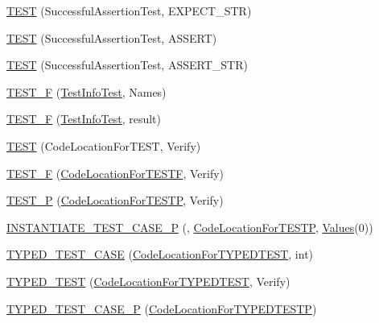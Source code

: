 \begin{DoxyCompactItemize}
\item 
\mbox{\hyperlink{namespacetesting_a9b1e4b53f277d25e6d6413a0004481bb}{T\+E\+ST}} (Successful\+Assertion\+Test, E\+X\+P\+E\+C\+T\+\_\+\+S\+TR)
\item 
\mbox{\hyperlink{namespacetesting_afbe4c8233faff6eba04902b3cb041632}{T\+E\+ST}} (Successful\+Assertion\+Test, A\+S\+S\+E\+RT)
\item 
\mbox{\hyperlink{namespacetesting_a83dfac108c207258287b9f7aa9171e8a}{T\+E\+ST}} (Successful\+Assertion\+Test, A\+S\+S\+E\+R\+T\+\_\+\+S\+TR)
\item 
\mbox{\hyperlink{namespacetesting_acd53db89097aba1468724d6446069b1e}{T\+E\+S\+T\+\_\+F}} (\mbox{\hyperlink{classtesting_1_1TestInfoTest}{Test\+Info\+Test}}, Names)
\item 
\mbox{\hyperlink{namespacetesting_ab00e29c00b3e29cdfa21d23b79dd3776}{T\+E\+S\+T\+\_\+F}} (\mbox{\hyperlink{classtesting_1_1TestInfoTest}{Test\+Info\+Test}}, result)
\item 
\mbox{\hyperlink{namespacetesting_af597d0ad4de0197141b78e9c1035e491}{T\+E\+ST}} (Code\+Location\+For\+T\+E\+ST, Verify)
\item 
\mbox{\hyperlink{namespacetesting_a782ec43081903a0aaa6d009218eba2a8}{T\+E\+S\+T\+\_\+F}} (\mbox{\hyperlink{classtesting_1_1CodeLocationForTESTF}{Code\+Location\+For\+T\+E\+S\+TF}}, Verify)
\item 
\mbox{\hyperlink{namespacetesting_af05768b7e2f14652d2c4f274ba1a5544}{T\+E\+S\+T\+\_\+P}} (\mbox{\hyperlink{classtesting_1_1CodeLocationForTESTP}{Code\+Location\+For\+T\+E\+S\+TP}}, Verify)
\item 
\mbox{\hyperlink{namespacetesting_a5b049e97e9082df909e4a0f740ff5d02}{I\+N\+S\+T\+A\+N\+T\+I\+A\+T\+E\+\_\+\+T\+E\+S\+T\+\_\+\+C\+A\+S\+E\+\_\+P}} (, \mbox{\hyperlink{classtesting_1_1CodeLocationForTESTP}{Code\+Location\+For\+T\+E\+S\+TP}}, \mbox{\hyperlink{namespacetesting_a8209ef59db08b8ad4beed30d8d6e6a88}{Values}}(0))
\item 
\mbox{\hyperlink{namespacetesting_af0459cc6cdfbbae821caf802c7f2bb72}{T\+Y\+P\+E\+D\+\_\+\+T\+E\+S\+T\+\_\+\+C\+A\+SE}} (\mbox{\hyperlink{classtesting_1_1CodeLocationForTYPEDTEST}{Code\+Location\+For\+T\+Y\+P\+E\+D\+T\+E\+ST}}, int)
\item 
\mbox{\hyperlink{namespacetesting_a400c572f732b06e836d6b3a5adfc4cf7}{T\+Y\+P\+E\+D\+\_\+\+T\+E\+ST}} (\mbox{\hyperlink{classtesting_1_1CodeLocationForTYPEDTEST}{Code\+Location\+For\+T\+Y\+P\+E\+D\+T\+E\+ST}}, Verify)
\item 
\mbox{\hyperlink{namespacetesting_a439eefbc85668f74fd9e0c2cb7c7d0b0}{T\+Y\+P\+E\+D\+\_\+\+T\+E\+S\+T\+\_\+\+C\+A\+S\+E\+\_\+P}} (\mbox{\hyperlink{classtesting_1_1CodeLocationForTYPEDTESTP}{Code\+Location\+For\+T\+Y\+P\+E\+D\+T\+E\+S\+TP}})

\end{DoxyCompactItemize}
